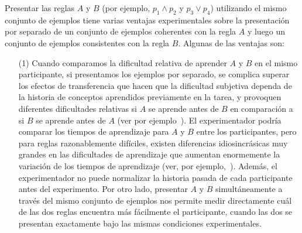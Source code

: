 Presentar las reglas $A$ y $B$ (por ejemplo, $p_1\land p_2$ y $p_3 \lor p_4$) utilizando el mismo conjunto de ejemplos tiene varias ventajas experimentales sobre la presentación por separado de un conjunto de ejemplos coherentes con la regla $A$ y luego un conjunto de ejemplos consistentes con la regla $B$. Algunas de las ventajas son:

\begin{enumerate}
\item [(1)] 
Cuando comparamos la dificultad relativa de aprender $A$ y $B$ en el mismo participante, si presentamos los ejemplos por separado, se complica superar los efectos de transferencia que hacen que la dificultad subjetiva dependa de la historia de conceptos aprendidos previamente en la tarea, y provoquen diferentes dificultades relativas si $A$ se aprende antes de $B$ en comparación a si $B$ se aprende antes de $A$ (ver por ejemplo~\cite{tano2020towards}). El experimentador podría comparar los tiempos de aprendizaje para $A$ y $B$ entre los participantes, pero para reglas razonablemente difíciles, existen diferencias idiosincrásicas muy grandes en las dificultades de aprendizaje que aumentan enormemente la variación de los tiempos de aprendizaje (ver, por ejemplo,~\cite{feldman2000minimization}). Además, el experimentador no puede normalizar la historia pasada de cada participante antes del experimento. Por otro lado, presentar $A$ y $B$ simultáneamente a través del mismo conjunto de ejemplos nos permite medir directamente cuál de las dos reglas encuentra más fácilmente el participante, cuando las dos se presentan exactamente bajo las mismas condiciones experimentales.


\end{enumerate}
